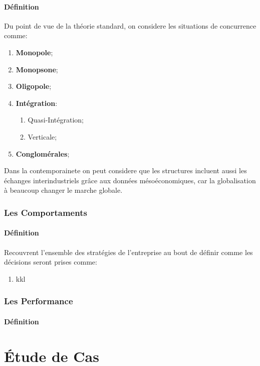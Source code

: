 \documentclass{article}
\begin{document}
\paragraph{Définition}Du point de vue de la théorie standard, on considere les situations de concurrence comme:
\begin{enumerate}
    \item \textbf{Monopole};

    \item \textbf{Monopsone};

    \item \textbf{Oligopole};

    \item \textbf{Intégration}:
    \begin{enumerate}[noitemsep]
        \item Quasi-Intégration;
        \item Verticale;
    \end{enumerate}

    \item \textbf{Conglomérales};
\end{enumerate}
Dans la contemporainete on peut considere que les structures incluent aussi les échanges interindustriels grâce aux données mésoéconomiques, car la globalisation à beaucoup changer le marche globale.

\subsubsection{Les Comportaments}
\paragraph{Définition}Recouvrent l'ensemble des stratégies de l'entreprise au bout de définir comme les décisions seront prises comme:
\begin{enumerate}
    \item kkl
\end{enumerate}

\subsubsection{Les Performance}
\paragraph{Définition}


\section{Étude de Cas}
\end{document}
